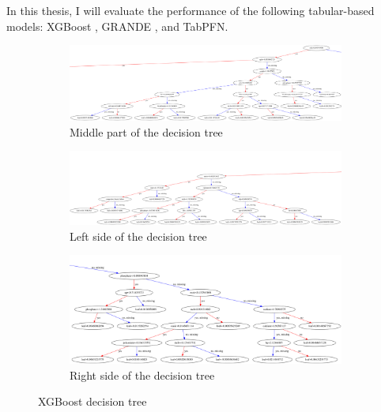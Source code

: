 \documentclass[../main.tex]{subfiles}
\begin{document}
In this thesis, I will evaluate the performance of the following tabular-based models: XGBoost \cite{xgboost-source}, GRANDE \cite{GRANDE-source}, and TabPFN\cite{tabpfn}.


\begin{figure}[h]%
    \centering
    \begin{subfigure}{0.8\textwidth}
        \centering
        \includegraphics[width=\linewidth]{Figure/xgb_tree_high_quality-mid.png}
        \caption{Middle part of the decision tree}
        \label{fig:image1}
    \end{subfigure}
    \hfill
    \begin{subfigure}{0.8\textwidth}
        \centering
        \includegraphics[width=\linewidth]{Figure/xgb_tree_high_quality-left.png}
        \caption{Left side of the decision tree}
        \label{fig:image2}
    \end{subfigure}
    \hfill
    \begin{subfigure}{0.8\textwidth}
        \centering
        \includegraphics[width=\linewidth]{Figure/xgb_tree_high_quality-right.png}
        \caption{Right side of the decision tree}
        \label{fig:image3}
    \end{subfigure}
    \caption{XGBoost decision tree}
    \label{fig:xgboost-tree}
\end{figure}
\end{document}
